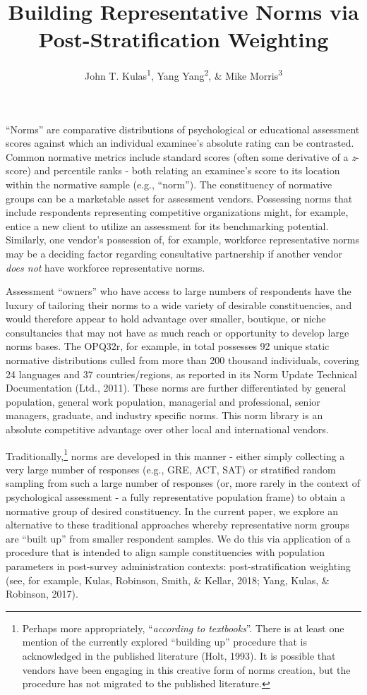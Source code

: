 \documentclass[
  ,man]{apa6}
\title{Building Representative Norms via Post-Stratification Weighting}
\author{John T. Kulas\textsuperscript{1}, Yang Yang\textsuperscript{2}, \& Mike Morris\textsuperscript{3}}
\date{}
\affiliation{\vspace{0.5cm}\textsuperscript{1} Montclair State University\\\textsuperscript{2} China Select\\\textsuperscript{3} CPP, Inc.}
\begin{document}
\maketitle

``Norms'' are comparative distributions of psychological or educational assessment scores against which an individual examinee's absolute rating can be contrasted. Common normative metrics include standard scores (often some derivative of a \emph{z}-score) and percentile ranks - both relating an examinee's score to its location within the normative sample (e.g., ``norm''). The constituency of normative groups can be a marketable asset for assessment vendors. Possessing norms that include respondents representing competitive organizations might, for example, entice a new client to utilize an assessment for its benchmarking potential. Similarly, one vendor's possession of, for example, workforce representative norms may be a deciding factor regarding consultative partnership if another vendor \emph{does not} have workforce representative norms.

Assessment ``owners'' who have access to large numbers of respondents have the luxury of tailoring their norms to a wide variety of desirable constituencies, and would therefore appear to hold advantage over smaller, boutique, or niche consultancies that may not have as much reach or opportunity to develop large norms bases. The OPQ32r, for example, in total possesses 92 unique static normative distributions culled from more than 200 thousand individuals, covering 24 languages and 37 countries/regions, as reported in its Norm Update Technical Documentation (Ltd., 2011). These norms are further differentiated by general population, general work population, managerial and professional, senior managers, graduate, and industry specific norms. This norm library is an absolute competitive advantage over other local and international vendors.

Traditionally,\footnote{Perhaps more appropriately, ``\emph{according to textbooks}''. There is at least one mention of the currently explored ``building up'' procedure that is acknowledged in the published literature (Holt, 1993). It is possible that vendors have been engaging in this creative form of norms creation, but the procedure has not migrated to the published literature.} norms are developed in this manner - either simply collecting a very large number of responses (e.g., GRE, ACT, SAT) or stratified random sampling from such a large number of responses (or, more rarely in the context of psychological assessment - a fully representative population frame) to obtain a normative group of desired constituency. In the current paper, we explore an alternative to these traditional approaches whereby representative norm groups are ``built up'' from smaller respondent samples. We do this via application of a procedure that is intended to align sample constituencies with population parameters in post-survey administration contexts: post-stratification weighting (see, for example, Kulas, Robinson, Smith, \& Kellar, 2018; Yang, Kulas, \& Robinson, 2017).
\end{document}
